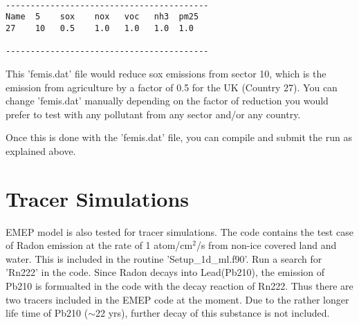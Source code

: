 \begin{verbatim}

-----------------------------------------
Name  5    sox    nox   voc   nh3  pm25 
27    10   0.5    1.0   1.0   1.0  1.0   

-----------------------------------------

\end{verbatim}        

This 'femis.dat' file would reduce sox emissions from sector 10, which
is the emission from  agriculture by a
factor of 0.5 for the UK (Country 27).  You can change 'femis.dat'
manually depending on the factor of
reduction you would prefer to test with any pollutant from any sector
and/or any country. 

Once this is done with the 'femis.dat' file, you can compile and
submit the run as explained above.   

\section{Tracer Simulations}

EMEP model is also tested for tracer simulations.  The code contains
the test case of Radon emission at the rate of 1 atom/cm$^{2}$/s from non-ice
covered land and water.  This is included in the routine
'Setup\_1d\_ml.f90'.  Run a search for 'Rn222' in the code.  Since Radon
decays into Lead(Pb210), the emission of Pb210 is formualted in the
code with the decay reaction of Rn222.  Thus there are two tracers
included in the EMEP code at the moment.  Due to the rather longer
life time of Pb210 (${\sim}$22 yrs), further decay of this substance is not
included.   
